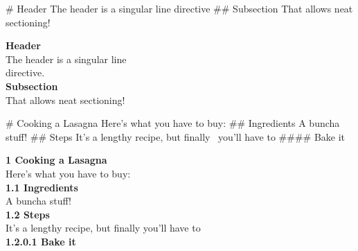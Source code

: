 \begin{examples}
  \begin{examplesource}
# Header
The header is a singular line
directive
## Subsection
That allows neat sectioning!
  \end{examplesource}
  \begin{exampleoutput}
    \textbf{\quad\Large Header}\\
    The header is a singular line\\
    directive.\\
    \textbf{\quad\large Subsection}\\
    That allows neat sectioning!\\
  \end{exampleoutput}
\begin{examplesource}
# Cooking a Lasagna
Here's what you have to buy:
## Ingredients
A buncha stuff!
## Steps
It's a lengthy recipe, but finally \
you'll have to
#### Bake it
\end{examplesource}
  \begin{exampleoutput}
    \textbf{\quad\Large 1 Cooking a Lasagna}\\
    Here's what you have to buy: \\
    \textbf{\quad\large 1.1 Ingredients}\\
    A buncha stuff! \\
    \textbf{\quad\large 1.2 Steps}\\
    It's a lengthy recipe, but finally you'll have to \\
    \textbf{\quad\small 1.2.0.1 Bake it}\\
  \end{exampleoutput}
\end{examples}

